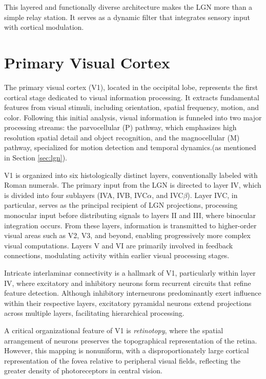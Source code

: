 This layered and functionally diverse architecture makes the LGN more than a simple relay station. It serves as a dynamic filter that integrates sensory input with cortical modulation.

\section{Primary Visual Cortex}
\label{sec:v1}

The primary visual cortex (V1), located in the occipital lobe, represents the first cortical stage dedicated to visual information processing. It extracts fundamental features from visual stimuli, including orientation, spatial frequency, motion, and color. Following this initial analysis, visual information is funneled into two major processing streams: the parvocellular (P) pathway, which emphasizes high resolution spatial detail and object recognition, and the magnocellular (M) pathway, specialized for motion detection and temporal dynamics.(as mentioned in Section \ref{sec:lgn}).

V1 is organized into six histologically distinct layers, conventionally labeled with
Roman numerals. The primary input from the LGN is directed to layer IV, which is divided into four sublayers (IVA, IVB, IVC$\alpha$, and IVC$\beta$). Layer IVC, 
in particular, serves as the principal recipient of LGN projections, processing
monocular input before distributing signals to layers II and III, where binocular
integration occurs. From these layers, information is transmitted to higher-order 
visual areas such as V2, V3, and beyond, enabling progressively more complex visual
computations. Layers V and VI are primarily involved in feedback connections, 
modulating activity within earlier visual processing stages.

Intricate interlaminar connectivity is a hallmark of V1, particularly within layer IV, 
where excitatory and inhibitory neurons form recurrent circuits that refine feature
detection. Although inhibitory interneurons predominantly exert influence within their
respective layers, excitatory pyramidal neurons extend projections across multiple
layers, facilitating hierarchical processing.

A critical organizational feature of V1 is \emph{retinotopy}, where the spatial
arrangement of neurons preserves the topographical representation of the retina. 
However, this mapping is nonuniform, with a disproportionately large cortical
representation of the fovea relative to peripheral visual fields, reflecting the
greater density of photoreceptors in central vision.

